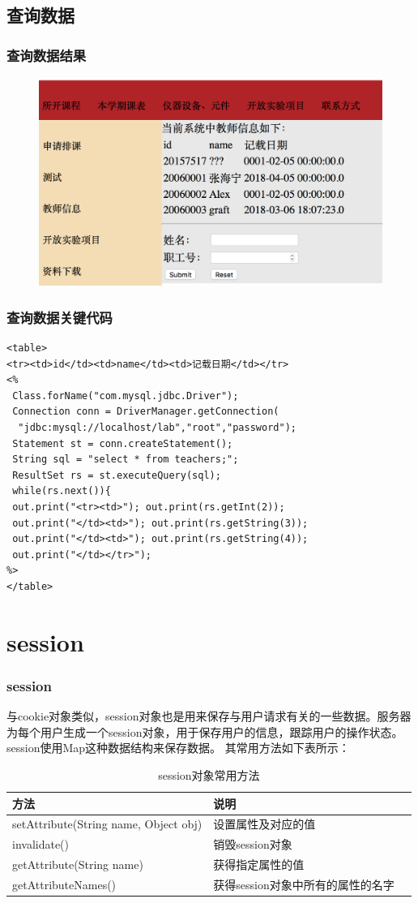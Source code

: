 \documentclass{beamer}
\begin{document}
\subsection{查询数据}
\begin{frame}
\frametitle{查询数据结果}
\begin{figure}
\includegraphics[width=1\linewidth]{sql4.png}
\end{figure}
\end{frame}

\begin{frame}[fragile]
\frametitle{查询数据关键代码}
\begin{lstlisting}
<table>
<tr><td>id</td><td>name</td><td>记载日期</td></tr>
<%	
 Class.forName("com.mysql.jdbc.Driver");
 Connection conn = DriverManager.getConnection(
  "jdbc:mysql://localhost/lab","root","password");
 Statement st = conn.createStatement();
 String sql = "select * from teachers;";
 ResultSet rs = st.executeQuery(sql);
 while(rs.next()){
 out.print("<tr><td>"); out.print(rs.getInt(2));
 out.print("</td><td>"); out.print(rs.getString(3));
 out.print("</td><td>"); out.print(rs.getString(4));
 out.print("</td></tr>");
%>
</table>
\end{lstlisting}
\end{frame}
\section{session}
\begin{frame}
\frametitle{session}
与cookie对象类似，session对象也是用来保存与用户请求有关的一些数据。服务器为每个用户生成一个session对象，用于保存用户的信息，跟踪用户的操作状态。session使用Map这种数据结构来保存数据。
其常用方法如下表所示：

\begin{table}
\begin{tabular}{l l l}
\toprule
\textbf{方法}  & \textbf{说明}\\
\midrule
setAttribute(String name, Object obj) &   设置属性及对应的值\\
invalidate() &   销毁session对象\\
getAttribute(String name) &  获得指定属性的值\\
getAttributeNames() &  获得session对象中所有的属性的名字\\
\bottomrule
\end{tabular}
\caption{session对象常用方法}
\end{table}
\end{frame}
\end{document}
